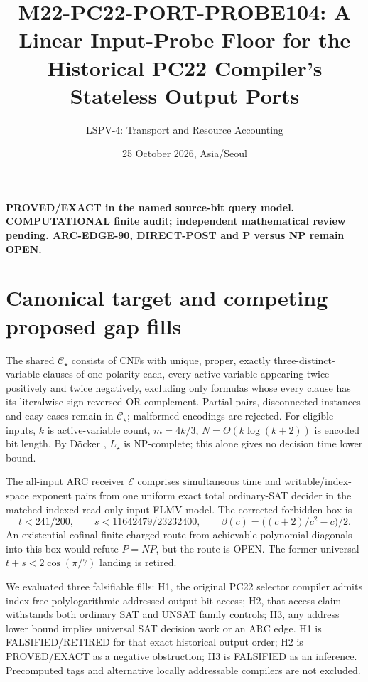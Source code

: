 \documentclass[11pt]{article}
\title{M22-PC22-PORT-PROBE104: A Linear Input-Probe Floor for the Historical PC22 Compiler's Stateless Output Ports}
\author{LSPV-4: Transport and Resource Accounting}
\date{25 October 2026, Asia/Seoul}
\begin{document}
\maketitle
\noindent\textbf{PROVED/EXACT in the named source-bit query model. COMPUTATIONAL finite audit; independent mathematical review pending. ARC-EDGE-90, DIRECT-POST and P versus NP remain OPEN.}
\section{Canonical target and competing proposed gap fills}
The shared \(\mathcal C_\star\) consists of CNFs with unique, proper, exactly three-distinct-variable clauses of one polarity each, every active variable appearing twice positively and twice negatively, excluding only formulas whose every clause has its literalwise sign-reversed OR complement. Partial pairs, disconnected instances and easy cases remain in \(\mathcal C_\star\); malformed encodings are rejected. For eligible inputs, \(k\) is active-variable count, \(m=4k/3\), \(N=\Theta(k\log(k+2))\) is encoded bit length. By D\"ocker \cite{docker}, \(L_\star\) is NP-complete; this alone gives no decision time lower bound.

The all-input ARC receiver \(\mathcal E\) comprises simultaneous time and writable/index-space exponent pairs from one uniform exact total ordinary-SAT decider in the matched indexed read-only-input FLMV model. The corrected forbidden box is
\[
t<241/200,\qquad s<11642479/23232400,\qquad
\beta(c)=\big((c+2)/c^2-c\big)/2.
\]
An existential cofinal finite charged route from achievable polynomial diagonals into this box would refute \(P=NP\), but the route is OPEN. The former universal \(t+s<2\cos(\pi/7)\) landing is retired.

We evaluated three falsifiable fills: H1, the original PC22 selector compiler admits index-free polylogarithmic addressed-output-bit access; H2, that access claim withstands both ordinary SAT and UNSAT family controls; H3, any address lower bound implies universal SAT decision work or an ARC edge. H1 is FALSIFIED/RETIRED for that exact historical output order; H2 is PROVED/EXACT as a negative obstruction; H3 is FALSIFIED as an inference. Precomputed tags and alternative locally addressable compilers are not excluded.
\end{document}
